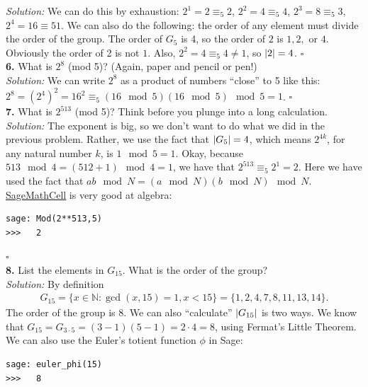 \documentclass{book}
\theoremstyle{definition}
\begin{document}
\noindent \textit{Solution:} We can do this by exhaustion: $2^1 = 2 \equiv_5  2$, $2^2 = 4\equiv_5  4$, $2^3 = 8 \equiv_5  3$, $2^4 = 16\equiv 5  1$.  We can also do the following: the order of any element must divide the order of the group. The order of $G_5$ is 4, so the order of $2$ is $1,2,$ or $4$. Obviously the order of 2 is not $1$. Also, $2^2 = 4 \equiv_5 4 \neq 1$, so $\abs{2} = 4$. \hfill $\square$\\ 




\noindent \textbf{6.} What is $2^8$ (mod 5)? (Again, paper and pencil or pen!)\\


\noindent \textit{Solution:} We can write $2^8$ as a product of numbers ``close'' to 5 like this: $2^8 = (2^4)^2 = 16^2 \equiv_5 (16 \mod 5)(16 \mod 5)\mod 5 = 1$. \hfill $\square$\\



\noindent \textbf{7.} What is $2^{513}$ (mod 5)? Think before you plunge into a long calculation.\\


\noindent \textit{Solution:} The exponent is big, so we don't want to do what we did in the previous problem. Rather, we use the fact that $\abs{G_5} = 4$, which means $2^{4k}$, for any natural number $k$, is $1 \mod 5 = 1$. Okay, because $513 \mod 4 = (512 + 1) \mod 4 = 1$, we have that $2^{513} \equiv_5 2^1 = \boxed{2}$. Here we have used the fact that $ab \mod N = (a\mod N)(b\mod N) \mod N$. \\

\noindent \href{https://sagecell.sagemath.org/}{\underline{SageMathCell}} is very good at algebra:
\begin{lstlisting}
sage: Mod(2**513,5)
>>>   2
\end{lstlisting}



\hfill $\square$\\



\noindent \textbf{8.} List the elements in $G_{15}$. What is the order of the group?\\


\noindent \textit{Solution:} By definition 
\begin{align}
G_{15} = \{ x\in \mathbb{N} : \gcd(x,15) = 1, x < 15 \} = \{ 1,2,4,7,8,11,13,14 \}.
\end{align}
The order of the group is 8. We can also ``calculate'' $\abs{G_{15}}$ is two ways. We know that $G_{15} = G_{3\cdot 5} = (3-1)(5-1) =  2\cdot 4 = 8$, using Fermat's Little Theorem. We can also use the Euler's totient function $\phi$ in Sage:
\begin{lstlisting}
sage: euler_phi(15)
>>>   8
\end{lstlisting}
\end{document}
